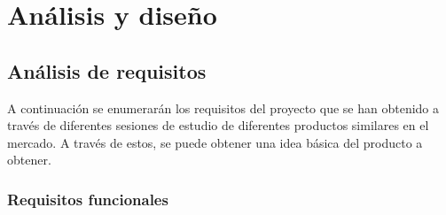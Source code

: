 \documentclass{subfiles}
\begin{document}
    \chapter{Análisis y diseño}
    \label{chap:analisis_y_diseno}

        \section{Análisis de requisitos}
        \label{sec:analisis_de_requisitos}
        A continuación se enumerarán los requisitos del proyecto que se han obtenido a través de diferentes sesiones de estudio de diferentes productos similares en el mercado. A través de estos, se puede obtener una idea básica del producto a obtener.

        \subsection{Requisitos funcionales}
        \label{sec:requisitos_funcionales}
\end{document}
